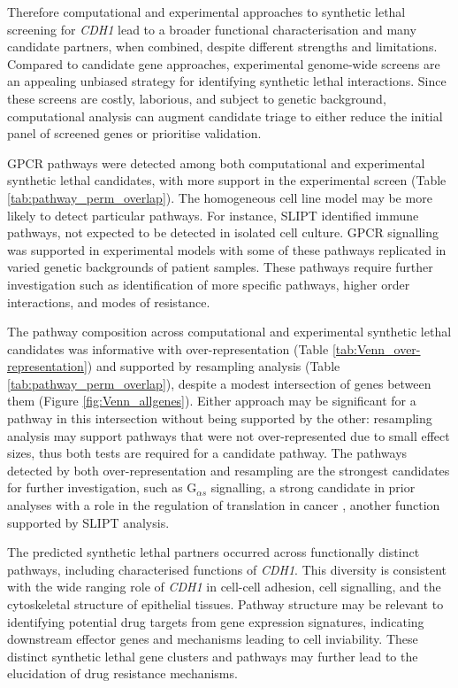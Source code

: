 Therefore computational and experimental approaches to synthetic lethal screening for \textit{CDH1} lead to a broader functional characterisation and many candidate partners, when combined, despite different strengths and limitations. Compared to candidate gene approaches, experimental genome-wide screens are an appealing unbiased strategy for identifying synthetic lethal interactions. Since these screens are costly, laborious, and subject to genetic background, computational analysis can augment candidate triage to either reduce the initial panel of screened genes or prioritise validation.

GPCR pathways were detected among both computational and experimental synthetic lethal candidates, with more support in the experimental screen (Table \ref{tab:pathway_perm_overlap}). The homogeneous cell line model may be more likely to detect particular pathways. For instance, SLIPT identified immune pathways, not expected to be detected in isolated cell culture. GPCR signalling was supported in experimental models \cite{Telford2015} with some of these pathways replicated in varied genetic backgrounds of patient samples. These pathways require further investigation such as identification of more specific pathways, higher order interactions, and modes of resistance.

The pathway composition across computational and experimental synthetic lethal candidates was informative with over-represent\-ation (Table \ref{tab:Venn_over-representation}) and supported by resampling analysis (Table \ref{tab:pathway_perm_overlap}), despite a modest intersection of genes between them (Figure \ref{fig:Venn_allgenes}).
Either approach may be significant for a pathway in this intersection without being supported by the other: resampling analysis may support pathways that were not over-represent\-ed due to small effect sizes, thus both tests are required for a candidate pathway.
The pathways detected by both over-represent\-ation and resampling are the strongest candidates for further investigation, such as G$_{\alpha s}$ signalling, a strong candidate in prior analyses with a role in the regulation of translation in cancer \cite{Gao2015}, another function supported by SLIPT analysis.

The predicted synthetic lethal partners occurred across functionally distinct pathways, including characterised functions of \textit{CDH1}. This diversity is consistent with the wide ranging role of \textit{CDH1} in cell-cell adhesion, cell signalling, and the cytoskeletal structure of epithelial tissues. Pathway structure may be relevant to identifying potential drug targets from gene expression signatures, indicating downstream effector genes and mechanisms leading to cell inviability. These distinct synthetic lethal gene clusters and pathways may further lead to the elucidation of drug resistance mechanisms.

